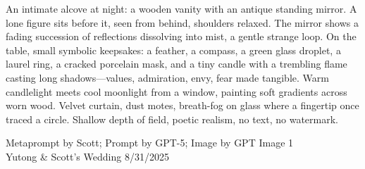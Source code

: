 \documentclass[12pt]{article}
\begin{document}
\noindent
\begin{adjustbox}{max size={\textwidth}{\textheight}}
\begin{varwidth}{\textwidth}
\RaggedRight
\footnotesize
An intimate alcove at night: a wooden vanity with an antique standing mirror. A lone figure sits before it, seen from behind, shoulders relaxed. The mirror shows a fading succession of reflections dissolving into mist, a gentle strange loop. On the table, small symbolic keepsakes: a feather, a compass, a green glass droplet, a laurel ring, a cracked porcelain mask, and a tiny candle with a trembling flame casting long shadows—values, admiration, envy, fear made tangible. Warm candlelight meets cool moonlight from a window, painting soft gradients across worn wood. Velvet curtain, dust motes, breath-fog on glass where a fingertip once traced a circle. Shallow depth of field, poetic realism, no text, no watermark.
\end{varwidth}
\end{adjustbox}
\vfill
{\raggedleft\footnotesize
Metaprompt by Scott; Prompt by GPT-5; Image by GPT Image 1 \\
Yutong \& Scott's Wedding 8/31/2025\par}
\end{document}
